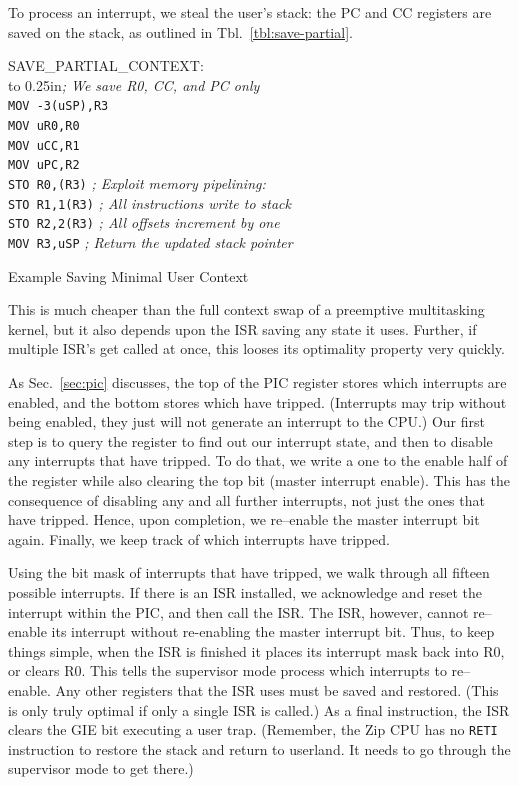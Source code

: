 \documentclass{gqtekspec}
\begin{document}
To process an interrupt, we steal the user's stack: the PC and CC registers
are saved on the stack, as outlined in Tbl.~\ref{tbl:save-partial}.
\begin{table}\begin{center}
\begin{tabbing}
SAVE\_PARTIAL\_CONTEXT: \\
\hbox to 0.25in{}\= {\em ; We save R0, CC, and PC only} \\
\>        {\tt MOV -3(uSP),R3} \\
\>        {\tt MOV uR0,R0} \\
\>        {\tt MOV uCC,R1} \\
\>        {\tt MOV uPC,R2} \\
\>        {\tt STO R0,(R3)} {\em ; Exploit memory pipelining: }\\
\>        {\tt STO R1,1(R3)} {\em ; All instructions write to stack }\\
\>        {\tt STO R2,2(R3)} {\em ; All offsets increment by one }\\
\>        {\tt MOV R3,uSP} {\em ; Return the updated stack pointer } \\
\end{tabbing}
\caption{Example Saving Minimal User Context}\label{tbl:save-partial}
\end{center}\end{table}
This is much cheaper than the full context swap of a preemptive multitasking
kernel, but it also depends upon the ISR saving any state it uses.  Further,
if multiple ISR's get called at once, this looses its optimality property
very quickly.

As Sec.~\ref{sec:pic} discusses, the top of the PIC register stores which 
interrupts are enabled, and the bottom stores which have tripped.  (Interrupts
may trip without being enabled, they just will not generate an interrupt to the
CPU.)  Our first step is to query the register to find out our interrupt
state, and then to disable any interrupts that have tripped.  To do
that, we write a one to the enable half of the register while also clearing
the top bit (master interrupt enable).  This has the consequence of disabling
any and all further interrupts, not just the ones that have tripped.  Hence,
upon completion, we re--enable the master interrupt bit again.   Finally,
we keep track of which interrupts have tripped.

Using the bit mask of interrupts that have tripped, we walk through all fifteen
possible interrupts.  If there is an ISR installed, we acknowledge and reset
the interrupt within the PIC, and then call the ISR.  The ISR, however, cannot
re--enable its interrupt without re-enabling the master interrupt bit.  Thus,
to keep things simple, when the ISR is finished it places its interrupt
mask back into R0, or clears R0.  This tells the supervisor mode process which
interrupts to re--enable.  Any other registers that the ISR uses must be
saved and restored.  (This is only truly optimal if only a single ISR is
called.)  As a final instruction, the ISR clears the GIE bit executing a user
trap.  (Remember, the Zip CPU has no {\tt RETI} instruction to restore the
stack and return to userland.  It needs to go through the supervisor mode to
get there.)
\end{document}
